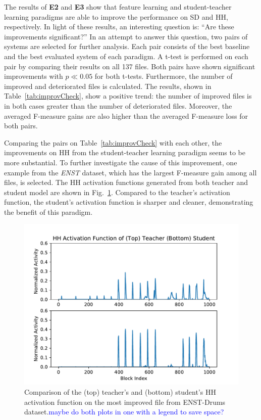 \documentclass{article}
\newcommand{\comment}[1]{{\textcolor{blue}{#1}}}
\begin{document}
The results of \textbf{E2} and \textbf{E3} show that feature learning and student-teacher learning paradigms are able to improve the performance on SD and HH, respectively. In light of these results, an interesting question is: ``Are these improvements significant?'' In an attempt to answer this question, two pairs of systems are selected for further analysis. Each pair consists of the best baseline and the best evaluated system of each paradigm. A t-test is performed on each pair by comparing their results on all 137 files. Both pairs have shown significant improvements with $p \ll 0.05$ for both t-tests. Furthermore, the number of improved and deteriorated files is calculated. The results, shown in Table~\ref{tab:improvCheck}, show a positive trend: the number of improved files is in both cases greater than the number of deteriorated files. Moreover, the averaged F-measure gains are also higher than the averaged F-measure loss for both pairs.  

Comparing the pairs on Table~\ref{tab:improvCheck} with each other, the improvements on HH from the student-teacher learning paradigm seems to be more substantial. To further investigate the cause of this improvement, one example from the \textit{ENST} dataset, which has the largest F-measure gain among all files, is selected. The HH activation functions generated from both teacher and student model are shown in Fig.~\ref{fig:exampleActiv}. Compared to the teacher's activation function, the student's activation function is sharper and cleaner, demonstrating the benefit of this paradigm.

\begin{figure}
\centering
\includegraphics[width = \columnwidth]{./figs/example_activ.pdf}
\caption{Comparison of the (top) teacher's and (bottom) student's HH activation function on the most improved file from ENST-Drums dataset.\comment{maybe do both plots in one with a legend to save space?}}
\label{fig:exampleActiv}
\end{figure}
\end{document}
